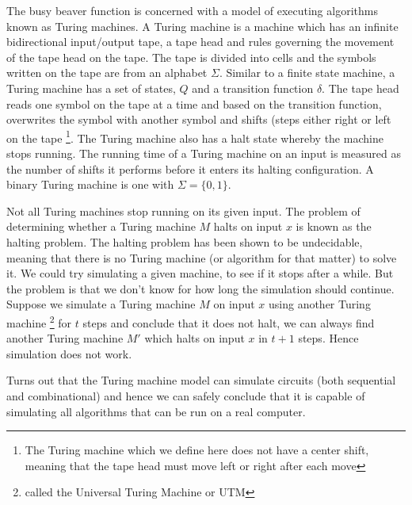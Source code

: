 \documentclass[a4paper]{article}
\begin{document}
The busy beaver function is concerned with a model of executing algorithms known
as Turing machines. A Turing machine is a machine which has an infinite
bidirectional input/output tape, a tape head and rules governing the movement
of the tape head on the tape. The tape is divided into cells and the symbols
written on the tape are from an alphabet \(\Sigma\). Similar to a finite state
machine, a Turing machine has a set of states, \(Q\) and a transition function
\(\delta\). The tape head reads one symbol on the tape at a time and based on
the transition function, overwrites the symbol with another symbol and shifts
(steps either right or left on the tape
\footnote{The Turing machine which we define here does not have a center shift,
  meaning that the tape head must move left or right after each move}. The
Turing machine also has a halt state whereby the machine stops running.
The running time of a Turing machine on an input is measured as the number of
shifts it performs before it enters its halting configuration. A binary Turing
machine is one with \(\Sigma = \{0 , 1\}\).

Not all Turing machines stop running on its given input. The problem of
determining whether a Turing machine \(M\) halts on input \(x\) is known as the
halting problem. The halting problem has been shown to be undecidable,
meaning that there is no Turing machine (or algorithm for that matter) to solve
it. We could try simulating a given machine, to see if it stops after a while.
But the problem is that we don't know for how long the simulation should
continue. Suppose we simulate a Turing machine \(M\) on input \(x\) using
another Turing machine \footnote{called the Universal Turing Machine or UTM}
for \(t\) steps and conclude that it does not halt, we can always find another
Turing machine \(M'\) which halts on input \(x\) in \(t + 1\) steps.
Hence simulation does not work.

Turns out that the Turing machine model can simulate circuits (both sequential
and combinational) and hence we can safely conclude that it is capable of
simulating all algorithms that can be run on a real computer.

\end{document}
